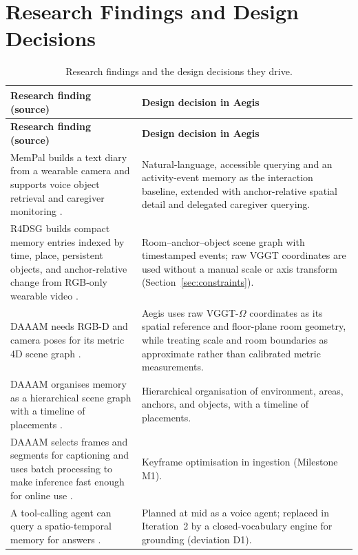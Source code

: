 \section{Research Findings and Design Decisions}
\label{sec:decisions}
\begin{ltab}\footnotesize
\begin{longtable}{@{}L{7.2cm}L{7.2cm}@{}}
\caption{Research findings and the design decisions they drive.}\label{tab:decisions}\\
\toprule
{}\textbf{Research finding (source)} & \textbf{Design decision in Aegis}\\
\midrule
\endfirsthead
\toprule
{}\textbf{Research finding (source)} & \textbf{Design decision in Aegis}\\
\midrule
\endhead
\bottomrule
\endfoot
MemPal builds a text diary from a wearable camera and supports voice object
retrieval and caregiver monitoring \cite{mempal2025,mempalpage}. & Natural-language,
accessible querying and an activity-event memory as the interaction baseline,
extended with anchor-relative spatial detail and delegated caregiver querying.\\
R4DSG builds compact memory entries indexed by time, place, persistent objects,
and anchor-relative change from RGB-only wearable video \cite{r4dsg2026}. &
Room--anchor--object scene graph with timestamped events; raw VGGT coordinates
are used without a manual scale or axis transform (Section~\ref{sec:constraints}).\\
DAAAM needs RGB-D and camera poses for its metric 4D scene graph
\cite{daaam2026}. & Aegis uses raw VGGT-$\Omega$ coordinates as its spatial
reference and floor-plane room geometry, while treating scale and room boundaries
as approximate rather than calibrated metric measurements.\\
DAAAM organises memory as a hierarchical scene graph with a timeline of
placements \cite{daaam2026}. & Hierarchical organisation of environment, areas,
anchors, and objects, with a timeline of placements.\\
DAAAM selects frames and segments for captioning and uses batch processing to
make inference fast enough for online use \cite{daaam2026}. & Keyframe
optimisation in ingestion (Milestone M1).\\
A tool-calling agent can query a spatio-temporal memory for answers
\cite{daaam2026}. & Planned at mid as a voice agent; replaced in Iteration~2 by a
closed-vocabulary engine for grounding (deviation D1).\\

\end{longtable}
\end{ltab}
